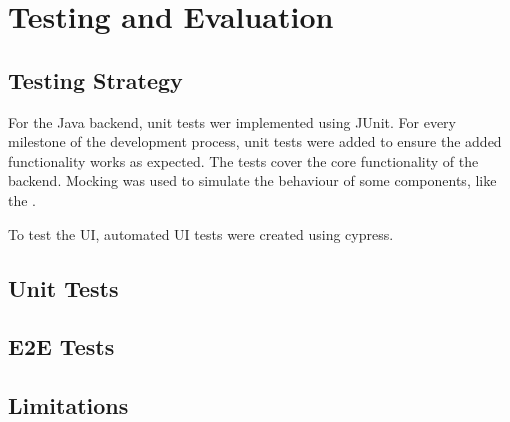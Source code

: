 \section{Testing and Evaluation}
  \label{sec:testing}

  \subsection{Testing Strategy}
  \label{subsec:testing-strategy}

  For the Java backend, unit tests wer implemented using JUnit. For every milestone of the development process, unit tests were added to ensure the added functionality works as expected. The tests cover the core functionality of the backend. Mocking was used to simulate the behaviour of some components, like the .

  To test the UI, automated UI tests were created using cypress.

  \subsection{Unit Tests}
  \label{subsec:test-results}

  \subsection{E2E Tests}
  \label{subsec:performance-evaluation}

  \subsection{Limitations}
  \label{subsec:user-feedback}